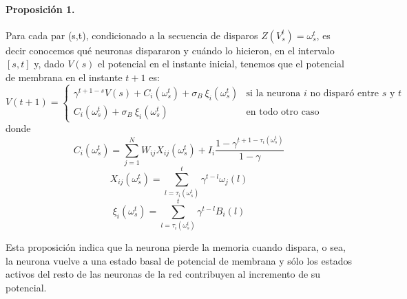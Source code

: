 \paragraph{Proposición 1.} Para cada par (s,t), condicionado a la secuencia de disparos  $Z(V_s^t)=\omega_s^t$, es decir conocemos qué neuronas dispararon y cuándo lo hicieron, en el intervalo $[s,t]$ y, dado $V(s)$ el potencial en el instante inicial, tenemos que el potencial de membrana en el instante $t+1$ es:
\begin{equation}
    V(t+1) = \left\{ \begin{array}{ll}
        \gamma^{t+1-s} V(s) + C_i(\omega_s^t) + \sigma_B \  \xi_i(\omega_s^t)   & \text{si la neurona } i \text{ no disparó entre } s \text{ y } t\\ 
        C_i(\omega_s^t) + \sigma_B \ \xi_i(\omega_s^t)  & \text{en todo otro caso}
    \end{array}\right.
    \label{eqn:potencialDef}
\end{equation}
donde
\begin{equation}
     C_i(\omega_s^t) = \sum_{j=1}^N W_{ij} X_{ij}(\omega_s^t) + I_i \frac{1-\gamma^{t+1-\tau_i(\omega_s^t) }}{1-\gamma}
\end{equation}
\begin{equation}
    X_{ij}(\omega_s^t) = \sum_{l=\tau_i(\omega_s^t)}^t \gamma^{t-l} \omega_j(l)
\end{equation}
\begin{equation}
    \xi_i(\omega_s^t) = \sum_{l=\tau_i(\omega_s^t)}^t \gamma^{t-l} B_i(l)
\end{equation}

Esta proposición indica que la neurona pierde la memoria cuando dispara, o sea, la neurona vuelve a una estado basal de potencial de membrana y sólo los estados activos del resto de las neuronas de la red contribuyen al incremento de su potencial. 

